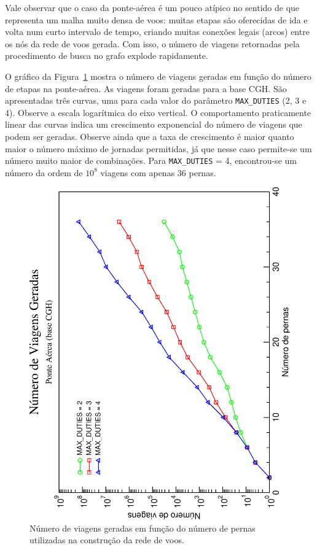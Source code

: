 \documentclass[12pt,a4paper]{article}
\begin{document}
Vale observar que o caso da ponte-aérea é um pouco atípico no sentido de que representa um malha 
muito densa de voos: muitas etapas são oferecidas de ida e volta num curto intervalo de tempo, 
criando muitas conexões legais (arcos) entre os nós da rede de voos gerada. Com isso, o número
de viagens retornadas pela procedimento de busca no grafo explode rapidamente.

O gráfico da Figura~\ref{fig:pairings} mostra o número de viagens geradas em função do número de
etapas na ponte-aérea. As viagens foram geradas para a base CGH. São apresentadas três curvas, uma
para cada valor do parâmetro \verb|MAX_DUTIES| (2, 3 e 4). Observe a escala logarítmica do eixo
vertical. O comportamento praticamente linear das curvas indica um crescimento exponencial do número
de viagens que podem ser geradas. Observe ainda que a taxa de crescimento é maior quanto maior o
número máximo de jornadas permitidas, já que nesse caso permite-se um número muito maior de
combinações. Para \verb|MAX_DUTIES| = 4, encontrou-se um número da ordem de $10^8$ viagens com
apenas 36 pernas.

\begin{figure}[htp]
	\begin{center}
		\includegraphics[scale=0.45,angle=-90]{fig/number_of_pairings.eps}
		\caption{Número de viagens geradas em função do número de pernas utilizadas na construção da
		rede de voos.}
		\label{fig:pairings}
	\end{center}
\end{figure}
\end{document}
